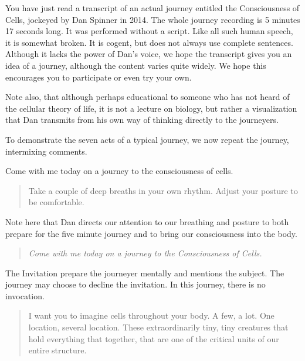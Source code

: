 \documentclass[12pt]{book}
\begin{document}
\hrulefill

You have just read a transcript of an actual journey entitled the Consciousness of Cells, jockeyed by Dan Spinner in 2014. The whole journey recording is 5 minutes 17 seconds long. It was performed without a script. Like all such human speech, it is somewhat broken. It is cogent, but does not always use complete sentences. Although it lacks the power of Dan’s voice, we hope the transcript gives you an idea of a journey, although the content varies quite widely. We hope this encourages you to participate or even  try your own.
					
Note also, that although perhaps educational to someone who has not heard of the cellular theory of life, it is not a lecture on biology, but rather a visualization that Dan transmits from his own way of thinking directly to the journeyers.
					
To demonstrate the seven acts of a typical journey, we now repeat the journey, intermixing comments.

\hrulefill
					
					
					
Come with me today on a journey to the consciousness of cells.


\begin{quote}{\em

    Take a couple of deep breaths in your own rhythm.
    Adjust your posture to be comfortable.
}
\end{quote}

Note here that Dan directs our attention to our breathing and posture to both prepare for the five minute journey and to bring our consciousness into the body.

\begin{quote}{\em
    Come with me today on a journey to the Consciousness of Cells.
}\end{quote}

The Invitation prepare the journeyer mentally and mentions
the subject. The journey may choose to decline the invitation.
In this journey, there is no invocation.

\begin{quote}{\em

I want you to imagine cells throughout your body. A few, a lot. One location, several location. These extraordinarily tiny, tiny creatures that hold everything that together, that are one of the critical units of our entire structure.

}\end{quote}
\end{document}
